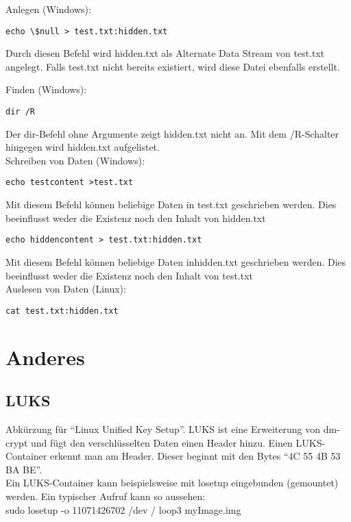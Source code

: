 \begin{multicols}{3}
Anlegen (Windows):\\

\begin{lstlisting}
echo \$null > test.txt:hidden.txt
\end{lstlisting}
Durch diesen Befehl wird hidden.txt als Alternate Data Stream von test.txt angelegt. Falls test.txt nicht bereits existiert, wird diese Datei ebenfalls erstellt.

Finden (Windows):\\

\begin{lstlisting}
dir /R
\end{lstlisting}
Der dir-Befehl ohne Argumente zeigt hidden.txt nicht an. Mit dem /R-Schalter hingegen wird hidden.txt aufgelistet.\\

Schreiben von Daten (Windows):\\

\begin{lstlisting}
echo testcontent >test.txt
\end{lstlisting}
Mit diesem Befehl können beliebige Daten in test.txt geschrieben werden. Dies beeinflusst weder die Existenz noch den Inhalt von hidden.txt\\

\begin{lstlisting}
echo hiddencontent > test.txt:hidden.txt
\end{lstlisting}
Mit diesem Befehl können beliebige Daten inhidden.txt geschrieben werden. Dies beeinflusst weder die Existenz noch den Inhalt von test.txt\\

Auslesen von Daten (Linux):\\
\begin{lstlisting}
cat test.txt:hidden.txt
\end{lstlisting}


\section{Anderes}
\subsection{LUKS}
Abkürzung für \enquote{Linux Unified Key Setup}. LUKS ist eine Erweiterung von dm-crypt und fügt den verschlüsselten Daten einen Header hinzu. Einen LUKS-Container erkennt man am Header. Dieser beginnt mit den Bytes \enquote{4C 55 4B 53 BA BE}.\\
Ein LUKS-Container kann beispielsweise mit losetup eingebunden (gemountet) werden. Ein typischer Aufruf kann so aussehen:\\
sudo losetup -o 11071426702 /dev / loop3 myImage.img\\
\end{multicols}